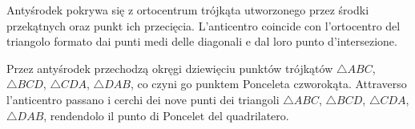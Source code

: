 \begin{proposition}
Antyśrodek pokrywa się z ortocentrum trójkąta utworzonego przez środki przekątnych oraz punkt ich przecięcia. %
L'anticentro coincide con l'ortocentro del triangolo formato dai punti medi delle diagonali e dal loro punto d'intersezione. %
\end{proposition}

\begin{proposition}
Przez antyśrodek przechodzą okręgi dziewięciu punktów trójkątów $\triangle ABC$, $\triangle BCD$, $\triangle CDA$, $\triangle DAB$, co czyni go punktem Ponceleta czworokąta. %
Attraverso l'anticentro passano i cerchi dei nove punti dei triangoli $\triangle ABC$, $\triangle BCD$, $\triangle CDA$, $\triangle DAB$, rendendolo il punto di Poncelet del quadrilatero. %
\end{proposition}

%